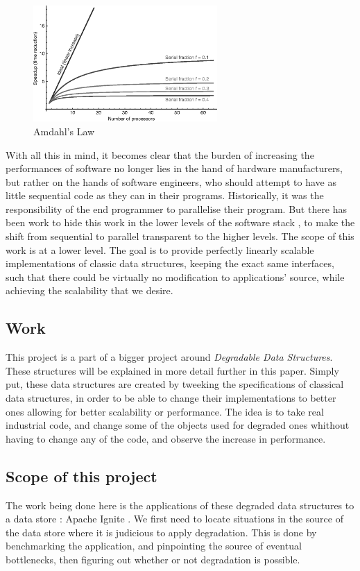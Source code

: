 \documentclass[conference]{IEEEtran}
\begin{document}
\begin{figure}[!ht]
\centerline{\includegraphics[width=70mm]{amdahl.png}}
\caption{Amdahl's Law}
\label{amdahl}
\end{figure}

With all this in mind, it becomes clear that the burden of increasing the performances of software no longer lies in the hand of hardware manufacturers, but rather on the hands of software engineers, who should attempt to have as little sequential code as they can in their programs.
Historically, it was the responsibility of the end programmer to parallelise their program. But there has been work to hide this work in the lower levels of the software stack \cite{scalable}, to make the shift from sequential to parallel transparent to the higher levels. The scope of this work is at a lower level. The goal is to provide perfectly linearly scalable implementations of classic data structures, keeping the exact same interfaces, such that there could be virtually no modification to applications' source, while achieving the scalability that we desire.


\subsection{Work}
This project is a part of a bigger project around \textit{Degradable Data Structures}. These structures will be explained in more detail further in this paper. Simply put, these data structures are created by tweeking the specifications of classical data structures, in order to be able to change their implementations to better ones allowing for better scalability or performance. The idea is to take real industrial code, and change some of the objects used for degraded ones whithout having to change any of the code, and observe the increase in performance.

\subsection{Scope of this project}
The work being done here is the applications of these degraded data structures to a data store : Apache Ignite \cite{ignite}. We first need to locate situations in the source of the data store where it is judicious to apply degradation. This is done by benchmarking the application, and pinpointing the source of eventual bottlenecks, then figuring out whether or not degradation is possible.
\end{document}
